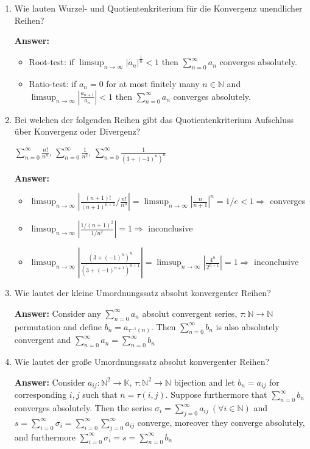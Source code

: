 \documentclass[11pt]{article}
\newcommand{\abs}[1]{\left|#1\right|}
\newcommand{\sumn}[4]{\sum_{#1=#2}^{#3}{#4}}
\newcommand{\NN}[0]{\mathbb{N}}
\newcommand{\KK}[0]{\mathbb{K}}
\begin{document}
\begin{enumerate}
    \item  Wie lauten Wurzel- und Quotientenkriterium für die Konvergenz unendlicher Reihen?
    
    \textbf{Answer:}
    \begin{itemize}
        \item Root-test: if $\limsup_{n\to\infty}\abs{a_n}^{\frac{1}{n}} < 1$ then $\sumn{n}{0}{\infty}{a_n}$ converges absolutely.
        \item Ratio-test: if $a_n = 0$ for at most finitely many $n\in\mathbb{N}$ and $\limsup_{n\to\infty}\abs{\frac{a_{n+1}}{a_n}} < 1$ then $\sumn{n}{0}{\infty}{a_n}$ converges absolutely.
    \end{itemize}

    \item  Bei welchen der folgenden Reihen gibt das Quotientenkriterium Aufschluss über Konvergenz oder Divergenz?
    \begin{center}
        $\sum_{n=0}^\infty \frac{n!}{n^n}$, $\sum_{n=0}^\infty \frac{1}{n^2}$, $\sum_{n=0}^\infty \frac{1}{(3+(-1)^n)^n}$
    \end{center}

    \textbf{Answer:}
    \begin{itemize}
        \item $\limsup_{n\to\infty}\abs{\frac{(n+1)!}{(n+1)^{n+1}}/\frac{n!}{n^n}} = \limsup_{n\to\infty}\abs{\frac{n}{n+1}}^n = 1/e < 1 \Rightarrow$ converges
        \item $\limsup_{n\to\infty}\abs{\frac{1/(n+1)^2}{1/n^2}} = 1 \Rightarrow$ inconclusive
        \item $\limsup_{n\to\infty}\abs{\frac{(3+(-1)^n)^n}{(3+(-1)^{n+1})^{n+1}}} = \limsup_{n\to\infty}\abs{\frac{4^n}{2^{n+1}}} = 1 \Rightarrow$ inconclusive
    \end{itemize}

    \item  Wie lautet der kleine Umordnungssatz absolut konvergenter Reihen?
    
   
    \textbf{Answer:} Consider any $\sumn{n}{0}{\infty}{a_n}$ absolut convergent series, $\tau\colon \mathbb{N} \to \mathbb{N}$ permutation and define $b_n = a_{\tau^{-1}(n)}$. Then $\sumn{n}{0}{\infty}{b_n}$ is also absolutely convergent and $\sumn{n}{0}{\infty}{a_n} = \sumn{n}{0}{\infty}{b_n}$

    \item  Wie lautet der große Umordnungssatz absolut konvergenter Reihen?
    
    \textbf{Answer:} Consider $a_{ij}:\NN^2 \to \KK$, $\tau:\NN^2 \to \NN$ bijection and let $b_n = a_{ij}$ for corresponding $i, j$ such that $n = \tau(i, j)$. Suppose furthermore that $\sumn{n}{0}{\infty}{b_n}$ converges absolutely. Then the series $\sigma_i = \sumn{j}{0}{\infty}{a_{ij}}~(\forall i\in\NN)$ and $s = \sumn{i}{0}{\infty}{\sigma_i} = \sumn{i}{0}{\infty}{\sumn{j}{0}{\infty}{a_{ij}}}$ converge, moreover they converge absolutely, and furthermore $\sumn{i}{0}{\infty}{\sigma_i} = s = \sumn{n}{0}{\infty}{b_n}$


\end{enumerate}
\end{document}
